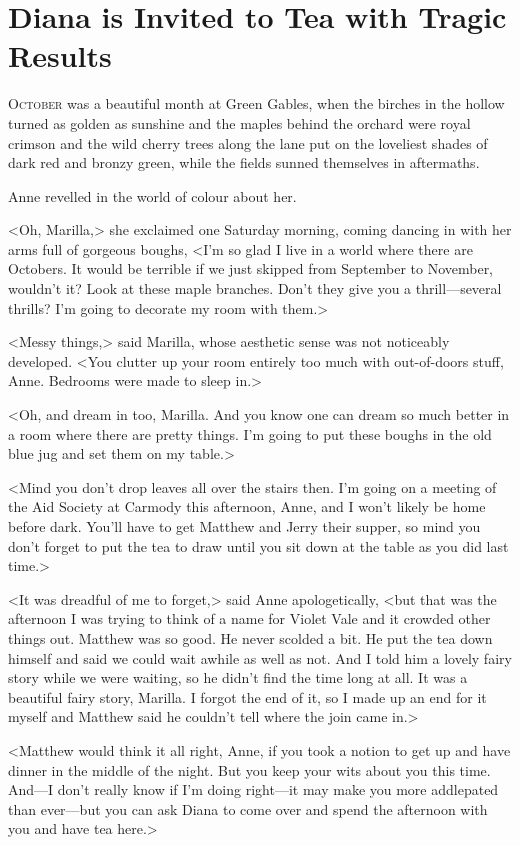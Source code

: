 \chapter{Diana is Invited to Tea with Tragic Results}

\lettrine[]{O}{ctober} was a beautiful month at Green Gables, when the birches in the hollow turned as golden as sunshine and the maples behind the orchard were royal crimson and the wild cherry trees along the lane put on the loveliest shades of dark red and bronzy green, while the fields sunned themselves in aftermaths.

Anne revelled in the world of colour about her.

<Oh, Marilla,> she exclaimed one Saturday morning, coming dancing in with her arms full of gorgeous boughs, <I'm so glad I live in a world where there are Octobers. It would be terrible if we just skipped from September to November, wouldn't it? Look at these maple branches. Don't they give you a thrill—several thrills? I'm going to decorate my room with them.>

<Messy things,> said Marilla, whose aesthetic sense was not noticeably developed. <You clutter up your room entirely too much with out-of-doors stuff, Anne. Bedrooms were made to sleep in.>

<Oh, and dream in too, Marilla. And you know one can dream so much better in a room where there are pretty things. I'm going to put these boughs in the old blue jug and set them on my table.>

<Mind you don't drop leaves all over the stairs then. I'm going on a meeting of the Aid Society at Carmody this afternoon, Anne, and I won't likely be home before dark. You'll have to get Matthew and Jerry their supper, so mind you don't forget to put the tea to draw until you sit down at the table as you did last time.>

<It was dreadful of me to forget,> said Anne apologetically, <but that was the afternoon I was trying to think of a name for Violet Vale and it crowded other things out. Matthew was so good. He never scolded a bit. He put the tea down himself and said we could wait awhile as well as not. And I told him a lovely fairy story while we were waiting, so he didn't find the time long at all. It was a beautiful fairy story, Marilla. I forgot the end of it, so I made up an end for it myself and Matthew said he couldn't tell where the join came in.>

<Matthew would think it all right, Anne, if you took a notion to get up and have dinner in the middle of the night. But you keep your wits about you this time. And—I don't really know if I'm doing right—it may make you more addlepated than ever—but you can ask Diana to come over and spend the afternoon with you and have tea here.>

